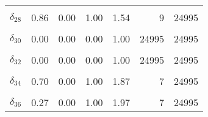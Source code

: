\begin{table}
\begin{tabular}[t]{lrrrrrr}
\cellcolor{gray!6}{$\delta_{27}$} & \cellcolor{gray!6}{0.74} & \cellcolor{gray!6}{0.00} & \cellcolor{gray!6}{1.00} & \cellcolor{gray!6}{1.92} & \cellcolor{gray!6}{7} & \cellcolor{gray!6}{24995}\\
$\delta_{28}$ & 0.86 & 0.00 & 1.00 & 1.54 & 9 & 24995\\
\cellcolor{gray!6}{$\delta_{29}$} & \cellcolor{gray!6}{0.36} & \cellcolor{gray!6}{0.00} & \cellcolor{gray!6}{1.00} & \cellcolor{gray!6}{1.69} & \cellcolor{gray!6}{8} & \cellcolor{gray!6}{24995}\\
$\delta_{30}$ & 0.00 & 0.00 & 0.00 & 1.00 & 24995 & 24995\\
\cellcolor{gray!6}{$\delta_{31}$} & \cellcolor{gray!6}{1.00} & \cellcolor{gray!6}{1.00} & \cellcolor{gray!6}{1.00} & \cellcolor{gray!6}{1.00} & \cellcolor{gray!6}{4003} & \cellcolor{gray!6}{24995}\\
$\delta_{32}$ & 0.00 & 0.00 & 0.00 & 1.00 & 24995 & 24995\\
\cellcolor{gray!6}{$\delta_{33}$} & \cellcolor{gray!6}{0.00} & \cellcolor{gray!6}{0.00} & \cellcolor{gray!6}{0.00} & \cellcolor{gray!6}{1.00} & \cellcolor{gray!6}{24995} & \cellcolor{gray!6}{24995}\\
$\delta_{34}$ & 0.70 & 0.00 & 1.00 & 1.87 & 7 & 24995\\
\cellcolor{gray!6}{$\delta_{35}$} & \cellcolor{gray!6}{0.00} & \cellcolor{gray!6}{0.00} & \cellcolor{gray!6}{0.00} & \cellcolor{gray!6}{1.00} & \cellcolor{gray!6}{24995} & \cellcolor{gray!6}{24995}\\
$\delta_{36}$ & 0.27 & 0.00 & 1.00 & 1.97 & 7 & 24995\\
\bottomrule
\end{tabular}
\end{table}